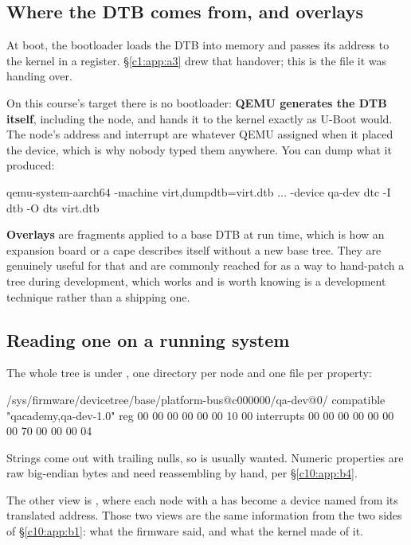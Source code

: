 \subsection{Where the DTB comes from, and overlays}
\label{c10:app:b8}

At boot, the bootloader loads the DTB into memory and passes its address to the kernel in a
register. \S\ref{c1:app:a3} drew that handover; this is the file it was handing over.

On this course's target there is no bootloader: \textbf{QEMU generates the DTB itself}, including
the  node, and hands it to the kernel exactly as U-Boot would. The node's address and
interrupt are whatever QEMU assigned when it placed the device, which is why nobody typed them
anywhere. You can dump what it produced:

\begin{shell}
qemu-system-aarch64 -machine virt,dumpdtb=virt.dtb ... -device qa-dev
dtc -I dtb -O dts virt.dtb
\end{shell}

\noindent \textbf{Overlays} are fragments applied to a base DTB at run time, which is how an
expansion board or a cape describes itself without a new base tree. They are genuinely useful for
that and are commonly reached for as a way to hand-patch a tree during development, which works and
is worth knowing is a development technique rather than a shipping one.

\subsection{Reading one on a running system}
\label{c10:app:b9}

The whole tree is under , one directory per node and one file
per property:

\begin{console}
/sys/firmware/devicetree/base/platform-bus@c000000/qa-dev@0/
    compatible      "qacademy,qa-dev-1.0"
    reg             00 00 00 00 00 00 10 00
    interrupts      00 00 00 00 00 00 00 70 00 00 00 04
\end{console}

\noindent Strings come out with trailing nulls, so  is usually wanted. Numeric
properties are raw big-endian bytes and need reassembling by hand, per \S\ref{c10:app:b4}.

The other view is , where each node with a  has
become a device named from its translated address. Those two views are the same information from the
two sides of \S\ref{c10:app:b1}: what the firmware said, and what the kernel made of it.
